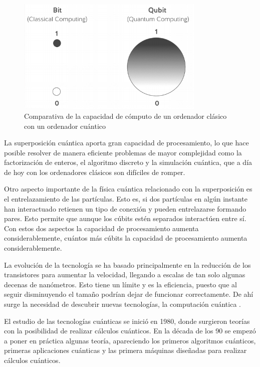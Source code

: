\begin{figure}[h]
	\centering
	\includegraphics[width=0.8\textwidth]{figuras/bit_cubit.png}
	\caption{Comparativa de la capacidad de cómputo de un ordenador clásico con un ordenador cuántico\cite{clasica-vs-cuantica}}
	\label{fig:bit-cubit}
\end{figure}

La superposición cuántica aporta gran capacidad de procesamiento, lo que hace posible resolver de manera eficiente problemas de mayor complejidad como la factorización de enteros, el algoritmo discreto y la simulación cuántica, que a día de hoy con los ordenadores clásicos son difíciles de romper. 

Otro aspecto importante de la física cuántica relacionado con la superposición es el entrelazamiento de las partículas\cite{cumputacion-cuantica-clasica}. Esto es, si dos partículas en algún instante han interactuado retienen un tipo de conexión y pueden entrelazarse formando pares. Esto permite que aunque los cúbits estén separados interactúen entre sí. Con estos dos aspectos la capacidad de procesamiento aumenta considerablemente, cuántos más cúbits la capacidad de procesamiento aumenta considerablemente.


La evolución de la tecnología se ha basado principalmente en la reducción de los transistores para aumentar la velocidad, llegando a escalas de tan solo algunas decenas de nanómetros. Esto tiene un límite y es la eficiencia, puesto que al seguir disminuyendo el tamaño podrían dejar de funcionar correctamente. De ahí surge la necesidad de descubrir nuevas tecnologías, la computación cuántica \cite{computacion-cuantica-wiki}.

El estudio de las tecnologías cuánticas se inició en 1980, donde surgieron teorías con la posibilidad de realizar cálculos cuánticos. En la década de los 90 se empezó a poner en práctica algunas teoría, apareciendo los primeros algoritmos cuánticos, primeras aplicaciones cuánticas y las primera máquinas diseñadas para realizar cálculos cuánticos.\\




